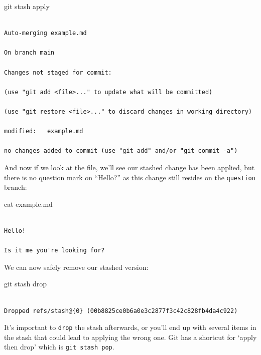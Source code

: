 \documentclass[
  letterpaper,
  DIV=11,
  numbers=noendperiod]{scrartcl}
\newenvironment{Shaded}{\begin{snugshade}}{\end{snugshade}}
\newcommand{\NormalTok}[1]{\textcolor[rgb]{0.00,0.23,0.31}{#1}}
\begin{document}
\begin{Shaded}
\begin{Highlighting}[]
\NormalTok{git stash apply}
\end{Highlighting}
\end{Shaded}

\begin{verbatim}

Auto-merging example.md

On branch main

Changes not staged for commit:

(use "git add <file>..." to update what will be committed)

(use "git restore <file>..." to discard changes in working directory)

modified:   example.md

no changes added to commit (use "git add" and/or "git commit -a")
\end{verbatim}

And now if we look at the file, we'll see our stashed change has been
applied, but there is no question mark on ``Hello?'' as this change
still resides on the \texttt{question} branch:

\begin{Shaded}
\begin{Highlighting}[]
\NormalTok{cat example.md}
\end{Highlighting}
\end{Shaded}

\begin{verbatim}

Hello!

Is it me you're looking for?
\end{verbatim}

We can now safely remove our stashed version:

\begin{Shaded}
\begin{Highlighting}[]
\NormalTok{git stash drop}
\end{Highlighting}
\end{Shaded}

\begin{verbatim}

Dropped refs/stash@{0} (00b8825ce0b6a0e3c2877f3c42c828fb4da4c922)
\end{verbatim}

It's important to \texttt{drop} the stash afterwards, or you'll end up
with several items in the stash that could lead to applying the wrong
one. Git has a shortcut for `apply then drop' which is
\texttt{git\ stash\ pop}.
\end{document}
